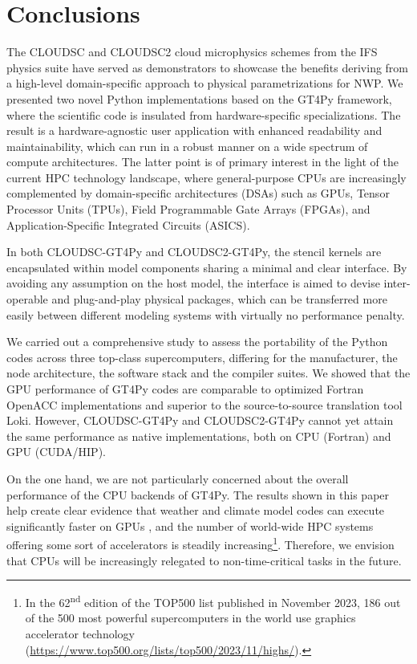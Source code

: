 \documentclass[main.tex]{subfiles}
\begin{document}
    \justifying

    \section{Conclusions}
    \label{section:conclusions} 

    The CLOUDSC and CLOUDSC2 cloud microphysics schemes from the IFS physics suite have served as demonstrators to showcase the benefits deriving from a high-level domain-specific approach to physical parametrizations for NWP. We presented two novel Python implementations based on the GT4Py framework, where the scientific code is insulated from hardware-specific specializations. The result is a hardware-agnostic user application with enhanced readability and maintainability, which can run in a robust manner on a wide spectrum of compute architectures. The latter point is of primary interest in the light of the current HPC technology landscape, where general-purpose CPUs are increasingly complemented by domain-specific architectures (DSAs) such as GPUs, Tensor Processor Units (TPUs), Field Programmable Gate Arrays (FPGAs), and Application-Specific Integrated Circuits (ASICS).

    In both CLOUDSC-GT4Py and CLOUDSC2-GT4Py, the stencil kernels are encapsulated within model components sharing a minimal and clear interface. By avoiding any assumption on the host model, the interface is aimed to devise inter-operable and plug-and-play physical packages, which can be transferred more easily between different modeling systems with virtually no performance penalty.

    We carried out a comprehensive study to assess the portability of the Python codes across three top-class supercomputers, differing for the manufacturer, the node architecture, the software stack and the compiler suites. We showed that the GPU performance of GT4Py codes are comparable to optimized Fortran OpenACC implementations and superior to the source-to-source translation tool Loki. However, CLOUDSC-GT4Py and CLOUDSC2-GT4Py cannot yet attain the same performance as native implementations, both on CPU (Fortran) and GPU (CUDA/HIP).

    On the one hand, we are not particularly concerned about the overall performance of the CPU backends of GT4Py. The results shown in this paper help create clear evidence that weather and climate model codes can execute significantly faster on GPUs \citep{fuhrer18}, and the number of world-wide HPC systems offering some sort of accelerators is steadily increasing\footnote{In the 62\textsuperscript{nd} edition of the TOP500 list published in November 2023, 186 out of the 500 most powerful supercomputers in the world use graphics accelerator technology (\url{https://www.top500.org/lists/top500/2023/11/highs/}).}. Therefore, we envision that CPUs will be increasingly relegated to non-time-critical tasks in the future.
\end{document}
